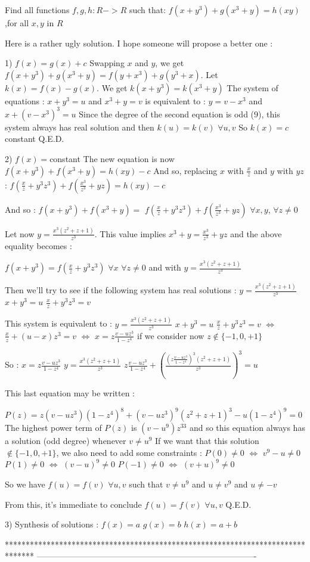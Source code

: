 \begin{solution}
	\begin{tcolorbox}Find all functions $ f,g,h: R - > R$ such that:
$ f(x + y^3) + g(x^3 + y) = h(xy)$,for all $ x,y$ in $ R$\end{tcolorbox}

Here is a rather ugly solution. I hope someone will propose a better one :

1) $ f(x)=g(x)+c$
Swapping $ x$ and $ y$, we get $ f(x+y^3)+g(x^3+y)=f(y+x^3)+g(y^3+x)$.
Let $ k(x)=f(x)-g(x)$. We get $ k(x+y^3)=k(x^3+y)$
The system of equations : $ x+y^3=u$ and $ x^3+y=v$ is equivalent to :
$ y=v-x^3$ and $ x+(v-x^3)^3=u$
Since the degree of the second equation is odd ($ 9$), this system always has real solution and then $ k(u)=k(v)$ $ \forall u,v$
So $ k(x)=c$ constant
Q.E.D.

2) $ f(x)=$constant
The new equation is now $ f(x+y^3)+f(x^3+y)=h(xy)-c$
And so, replacing $ x$ with $ \frac xz$ and $ y$ with $ yz$ : $ f(\frac xz+y^3z^3)+f(\frac{x^3}{z^3}+yz)=h(xy)-c$

And so : $ f(x+y^3)+f(x^3+y)=$ $ f(\frac xz+y^3z^3)+f(\frac{x^3}{z^3}+yz)$ $ \forall x,y$, $ \forall z\neq 0$

Let now $ y=\frac{x^3(z^2+z+1)}{z^3}$. This value implies $ x^3+y=\frac{x^3}{z^3}+yz$ and the above equality becomes :

$ f(x+y^3)=f(\frac xz+y^3z^3)$ $ \forall x$ $ \forall z\neq 0$ and with $ y=\frac{x^3(z^2+z+1)}{z^3}$

Then we'll try to see if the following system has real solutions :
$ y=\frac{x^3(z^2+z+1)}{z^3}$
$ x+y^3=u$
$ \frac xz+y^3z^3=v$

This system is equivalent to :
$ y=\frac{x^3(z^2+z+1)}{z^3}$
$ x+y^3=u$
$ \frac xz+y^3z^3=v$ $ \iff$ $ \frac xz+(u-x)z^3=v$ $ \iff$ $ x=z\frac{v-uz^3}{1-z^4}$ if we consider now $ z\notin\{-1,0,+1\}$

So :
$ x=z\frac{v-uz^3}{1-z^4}$
$ y=\frac{x^3(z^2+z+1)}{z^3}$
$ z\frac{v-uz^3}{1-z^4}+\left(\frac{(z\frac{v-uz^3}{1-z^4})^3(z^2+z+1)}{z^3}\right)^3=u$

This last equation may be written :

$ P(z)=z(v-uz^3)(1-z^4)^8+(v-uz^3)^9(z^2+z+1)^3-u(1-z^4)^9=0$
The highest power term of $ P(z)$ is $ (v-u^9)z^{33}$ and so this equation always has a solution (odd degree) whenever $ v\neq u^9$
If we want that this solution $ \notin\{-1,0,+1\}$, we also need to add some constraints :
$ P(0)\neq 0$ $ \iff$ $ v^9-u\neq 0$
$ P(1)\neq 0$ $ \iff$ $ (v-u)^9\neq 0$
$ P(-1)\neq 0$ $ \iff$ $ (v+u)^9\neq 0$

So we have $ f(u)=f(v)$ $ \forall u,v$ such that $ v\neq u^9$ and $ u\neq v^9$ and $ u\neq -v$

From this, it's immediate to conclude $ f(u)=f(v)$ $ \forall u,v$
Q.E.D.

3) Synthesis of solutions :
$ f(x)=a$
$ g(x)=b$
$ h(x)=a+b$
\end{solution}
*******************************************************************************
-------------------------------------------------------------------------------


